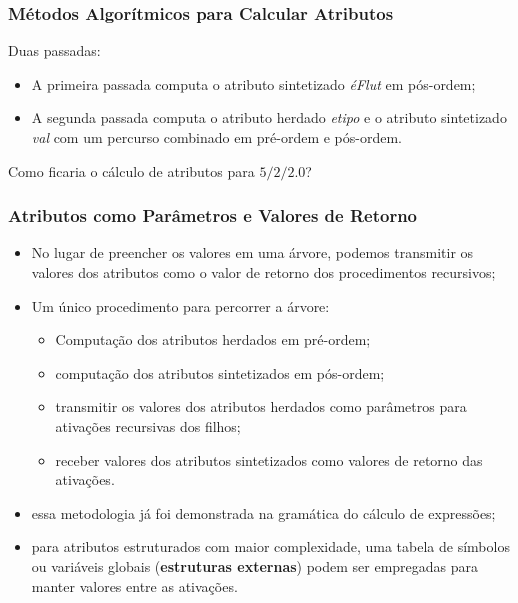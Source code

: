 \documentclass[table]{beamer}
\begin{document}
\begin{frame}
   \frametitle{Métodos Algorítmicos para Calcular Atributos}
   Duas passadas:
   \begin{itemize}
      \item A primeira passada computa o atributo sintetizado \textit{éFlut} em pós-ordem;
      \item A segunda passada computa o atributo herdado \textit{etipo} e o atributo sintetizado \textit{val} com um percurso combinado em pré-ordem e pós-ordem.
   \end{itemize}
   Como ficaria o cálculo de atributos para $5/2/2.0$?
\end{frame}

\begin{frame}
   \frametitle{Atributos como Parâmetros e Valores de Retorno}
   \begin{itemize}
      \item No lugar de preencher os valores em uma árvore, podemos transmitir os valores dos atributos como o valor de retorno dos procedimentos recursivos;
      \item Um único procedimento para percorrer a árvore:
      \begin{itemize}
         \item Computação dos atributos herdados em pré-ordem;
	 \item computação dos atributos sintetizados em pós-ordem;
	 \item transmitir os valores dos atributos herdados como parâmetros para ativações recursivas dos filhos;
	 \item receber valores dos atributos sintetizados como valores de retorno das ativações.
      \end{itemize}
      \item essa metodologia já foi demonstrada na gramática do cálculo de expressões;
      \item para atributos estruturados com maior complexidade, uma tabela de símbolos ou variáveis globais (\textbf{estruturas externas}) podem ser empregadas para manter valores entre as ativações.
   \end{itemize}
\end{frame}
\end{document}
